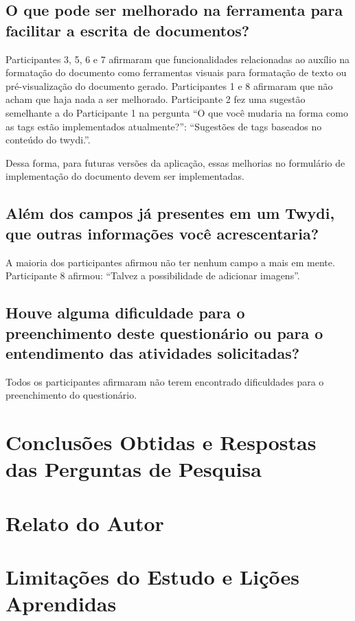 \subsection{O que pode ser melhorado na ferramenta para facilitar a escrita de documentos?}

Participantes 3, 5, 6 e 7 afirmaram que funcionalidades relacionadas ao auxílio na formatação do documento como ferramentas visuais para formatação de texto ou pré-visualização do documento gerado. Participantes 1 e 8 afirmaram que não acham que haja nada a ser melhorado. Participante 2 fez uma sugestão semelhante a do Participante 1 na pergunta ``O que você mudaria na forma como as tags estão implementados atualmente?'': ``Sugestões de tags baseados no conteúdo do twydi.''.

Dessa forma, para futuras versões da aplicação, essas melhorias no formulário de implementação do documento devem ser implementadas.

\subsection{Além dos campos já presentes em um Twydi, que outras informações você acrescentaria?}

A maioria dos participantes afirmou não ter nenhum campo a mais em mente. Participante 8 afirmou: ``Talvez a possibilidade de adicionar imagens''.

\subsection{Houve alguma dificuldade para o preenchimento deste questionário ou para o entendimento das atividades solicitadas?}

Todos os participantes afirmaram não terem encontrado dificuldades para o preenchimento do questionário.

\section{Conclusões Obtidas e Respostas das Perguntas de Pesquisa}

\section{Relato do Autor}


\section{Limitações do Estudo e Lições Aprendidas}

